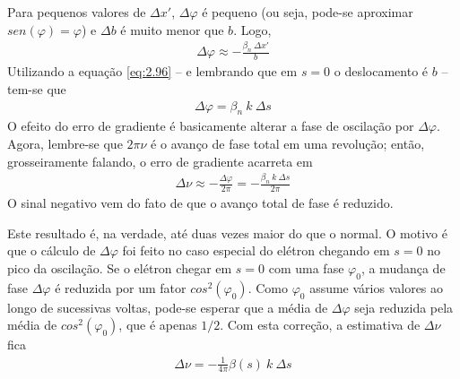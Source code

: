 Para pequenos valores de $\Delta x'$, $\Delta \varphi$ é pequeno (ou seja, pode-se aproximar $sen(\varphi) = \varphi$) e $\Delta b$ é muito menor que $b$. Logo,
\begin{align}
	\Delta \varphi \approx -\frac{\beta_n\ \Delta x'}{b}
\end{align}
Utilizando a equação \eqref{eq:2.96} -- e lembrando que em $s=0$ o deslocamento é $b$ -- tem-se que
\begin{align*}
	\Delta \varphi = \beta_n\ k\ \Delta s
\end{align*}
O efeito do erro de gradiente é basicamente alterar a fase de oscilação por $\Delta \varphi$. Agora, lembre-se que $2\pi\nu$ é o avanço de fase total em uma revolução; então, grosseiramente falando, o erro de gradiente acarreta em
\begin{align}
	\Delta \nu \approx - \frac{\Delta \varphi}{2\pi} = -\frac{\beta_n\ k\ \Delta s}{2\pi}
\end{align}
O sinal negativo vem do fato de que o avanço total de fase é reduzido.

Este resultado é, na verdade, até duas vezes maior do que o normal. O motivo é que o cálculo de $\Delta \varphi$ foi feito no caso especial do elétron chegando em $s=0$ no pico da oscilação. Se o elétron chegar em $s=0$ com uma fase $\varphi_0$, a mudança de fase $\Delta \varphi$ é reduzida por um fator $cos^2(\varphi_0)$. Como $\varphi_0$ assume vários valores ao longo de sucessivas voltas, pode-se esperar que a média de $\Delta \varphi$ seja reduzida pela média de $cos^2(\varphi_0)$, que é apenas $1/2$. Com esta correção, a estimativa de $\Delta \nu$ fica
\begin{align}
	\Delta \nu = -\frac{1}{4\pi}\beta(s)\ k\ \Delta s
\end{align}

